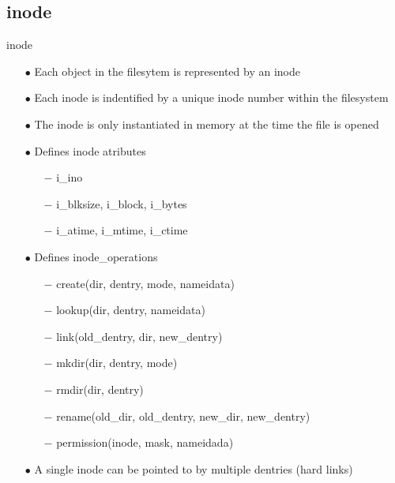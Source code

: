 \documentclass{beamer}
\begin{document}
\subsection{inode}
\begin{frame}{inode}
	
	\begin{itemize}[<+->]

		\item[$\bullet$]{Each object in the filesytem is represented by an inode}
		\item[$\bullet$]{Each inode is indentified by a unique inode number within the filesystem}		
		\item[$\bullet$]{The inode is only instantiated in memory at the time the file is opened}
		
		\item[$\bullet$]{Defines inode atributes}
			\begin{itemize}
				\item[$-$]{i\_ino}
				\item[$-$]{i\_blksize, i\_block, i\_bytes}
				\item[$-$]{i\_atime, i\_mtime, i\_ctime}
			\end{itemize}
	\end{itemize}

	\begin{itemize}[<+->]
		\item[$\bullet$]{Defines inode\_operations}
			\begin{itemize}
				\item[$-$]{create(dir, dentry, mode, nameidata)}
				\item[$-$]{lookup(dir, dentry, nameidata)}
				\item[$-$]{link(old\_dentry, dir, new\_dentry)}
				\item[$-$]{mkdir(dir, dentry, mode)}
				\item[$-$]{rmdir(dir, dentry)}
				\item[$-$]{rename(old\_dir, old\_dentry, new\_dir, new\_dentry)}	
				\item[$-$]{permission(inode, mask, nameidada)}
			\end{itemize}

		\item[$\bullet$]{A single inode can be pointed to by multiple dentries (hard links)}
	\end{itemize}
\end{frame}
\end{document}
